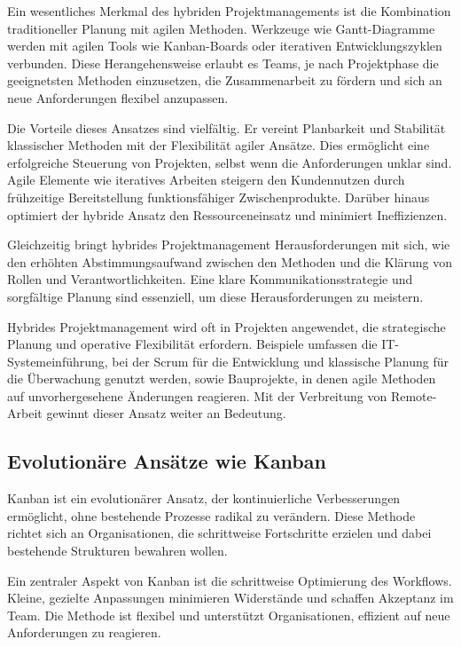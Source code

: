 \documentclass[ngerman]{seminarvorlage}
\begin{document}
Ein wesentliches Merkmal des hybriden Projektmanagements ist die Kombination traditioneller Planung mit agilen Methoden. Werkzeuge wie Gantt-Diagramme werden mit agilen Tools wie Kanban-Boards oder iterativen Entwicklungszyklen verbunden. Diese Herangehensweise erlaubt es Teams, je nach Projektphase die geeignetsten Methoden einzusetzen, die Zusammenarbeit zu fördern und sich an neue Anforderungen flexibel anzupassen.

Die Vorteile dieses Ansatzes sind vielfältig. Er vereint Planbarkeit und Stabilität klassischer Methoden mit der Flexibilität agiler Ansätze. Dies ermöglicht eine erfolgreiche Steuerung von Projekten, selbst wenn die Anforderungen unklar sind. Agile Elemente wie iteratives Arbeiten steigern den Kundennutzen durch frühzeitige Bereitstellung funktionsfähiger Zwischenprodukte. Darüber hinaus optimiert der hybride Ansatz den Ressourceneinsatz und minimiert Ineffizienzen.

Gleichzeitig bringt hybrides Projektmanagement Herausforderungen mit sich, wie den erhöhten Abstimmungsaufwand zwischen den Methoden und die Klärung von Rollen und Verantwortlichkeiten. Eine klare Kommunikationsstrategie und sorgfältige Planung sind essenziell, um diese Herausforderungen zu meistern.

Hybrides Projektmanagement wird oft in Projekten angewendet, die strategische Planung und operative Flexibilität erfordern. Beispiele umfassen die IT-Systemeinführung, bei der Scrum für die Entwicklung und klassische Planung für die Überwachung genutzt werden, sowie Bauprojekte, in denen agile Methoden auf unvorhergesehene Änderungen reagieren. Mit der Verbreitung von Remote-Arbeit gewinnt dieser Ansatz weiter an Bedeutung.
\cite{cassini_agile_2024, kupeli_hybrides_2023, dittmann_hybrides_2023}

\subsection{Evolutionäre Ansätze wie Kanban}
Kanban ist ein evolutionärer Ansatz, der kontinuierliche Verbesserungen ermöglicht, ohne bestehende Prozesse radikal zu verändern. Diese Methode richtet sich an Organisationen, die schrittweise Fortschritte erzielen und dabei bestehende Strukturen bewahren wollen.

Ein zentraler Aspekt von Kanban ist die schrittweise Optimierung des Workflows. Kleine, gezielte Anpassungen minimieren Widerstände und schaffen Akzeptanz im Team. Die Methode ist flexibel und unterstützt Organisationen, effizient auf neue Anforderungen zu reagieren. 
\end{document}
